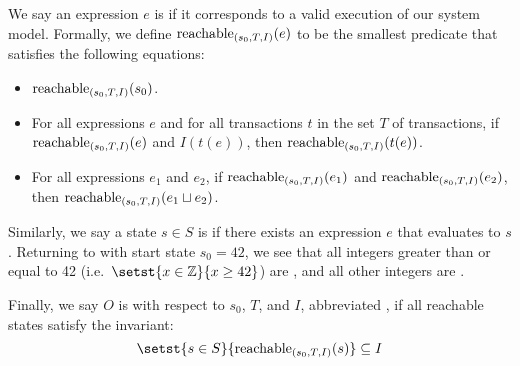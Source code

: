 {}

We say an expression $e$ is  if it corresponds to a
valid execution of our system model. Formally, we define
$\text{reachable}_{(s_0, T, I)}(e)$ to be the smallest predicate that satisfies the
following equations:
\begin{itemize}
  \item
    $\text{reachable}_{(s_0, T, I)}(s_0)$.
  \item
    For all expressions $e$ and for all transactions $t$ in the set $T$ of
    transactions, if $\text{reachable}_{(s_0, T, I)}(e)$ and $I(t(e))$, then
    $\text{reachable}_{(s_0, T, I)}(t(e))$.
  \item
    For all expressions $e_1$ and $e_2$, if $\text{reachable}_{(s_0, T, I)}(e_1)$ and
    $\text{reachable}_{(s_0, T, I)}(e_2)$, then $\text{reachable}_{(s_0, T, I)}(e_1 \sqcup
    e_2)$.
\end{itemize}
Similarly, we say a state $s \in S$ is \sTIreachable{} if there exists an
\sTIreachable{} expression $e$ that evaluates to $s$. Returning to
 with start state $s_0 = 42$, we see that all integers greater
than or equal to 42 (i.e.\ $\setst{x \in \ints}{x \geq 42}$) are
\sTIreachable{}, and all other integers are \sTIunreachable{}.

Finally, we say $O$ is  with respect to $s_0$,
$T$, and $I$, abbreviated , if all reachable states
satisfy the invariant:
\[
  \hfill
  \setst{s \in S}{\sTIreachablepredicate{s}} \subseteq I
  \hfill
\]
